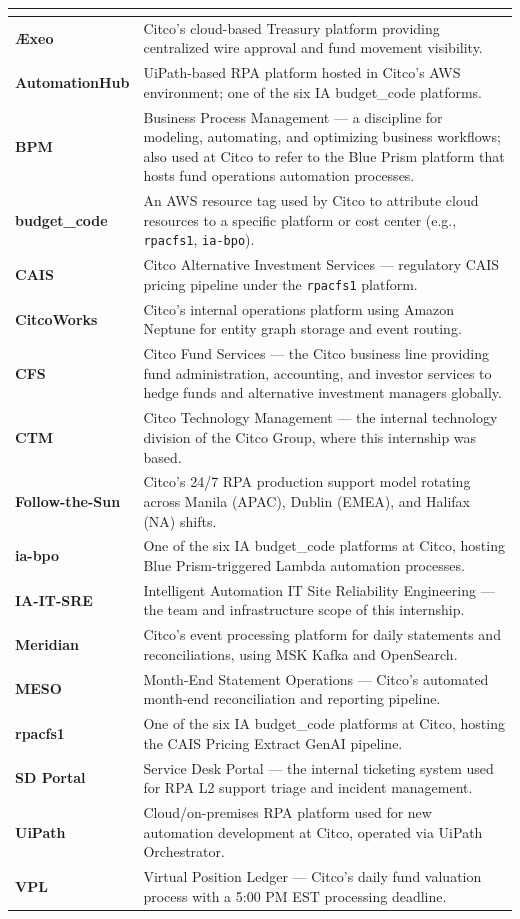 {\begin{longtable}{@{\hspace{\tabcolsep}}>{\bfseries}p{}p{}@{\hspace{\tabcolsep}}}
\multicolumn{2}{l}{\textit{\textbf{Citco Platforms and Internal Terms}}} \\
\hline
\AE xeo & Citco's cloud-based Treasury platform providing centralized wire approval and fund movement visibility. \\
AutomationHub & UiPath-based RPA platform hosted in Citco's AWS environment; one of the six IA budget\_code platforms. \\
BPM & Business Process Management — a discipline for modeling, automating, and optimizing business workflows; also used at Citco to refer to the Blue Prism platform that hosts fund operations automation processes. \\
budget\_code & An AWS resource tag used by Citco to attribute cloud resources to a specific platform or cost center (e.g., \texttt{rpacfs1}, \texttt{ia-bpo}). \\
CAIS & Citco Alternative Investment Services — regulatory CAIS pricing pipeline under the \texttt{rpacfs1} platform. \\
CitcoWorks & Citco's internal operations platform using Amazon Neptune for entity graph storage and event routing. \\
CFS & Citco Fund Services — the Citco business line providing fund administration, accounting, and investor services to hedge funds and alternative investment managers globally. \\
CTM & Citco Technology Management — the internal technology division of the Citco Group, where this internship was based. \\
Follow-the-Sun & Citco's 24/7 RPA production support model rotating across Manila (APAC), Dublin (EMEA), and Halifax (NA) shifts. \\
ia-bpo & One of the six IA budget\_code platforms at Citco, hosting Blue Prism-triggered Lambda automation processes. \\
IA-IT-SRE & Intelligent Automation IT Site Reliability Engineering — the team and infrastructure scope of this internship. \\
Meridian & Citco's event processing platform for daily statements and reconciliations, using MSK Kafka and OpenSearch. \\
MESO & Month-End Statement Operations — Citco's automated month-end reconciliation and reporting pipeline. \\
rpacfs1 & One of the six IA budget\_code platforms at Citco, hosting the CAIS Pricing Extract GenAI pipeline. \\
SD Portal & Service Desk Portal — the internal ticketing system used for RPA L2 support triage and incident management. \\
UiPath & Cloud/on-premises RPA platform used for new automation development at Citco, operated via UiPath Orchestrator. \\
VPL & Virtual Position Ledger — Citco's daily fund valuation process with a 5:00 PM EST processing deadline. \\


\end{longtable}}
